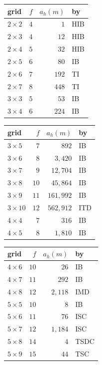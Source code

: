 \begin{table}[!htb]
\centering\scriptsize\setlength{\tabcolsep}{3pt}
\begin{tabular}{@{}lrrl@{}}
\toprule
grid & $f$ & $a_h(m)$ & by \\
\midrule
$2\times2$ & $4$ & $1$ & HIB \\
$2\times3$ & $4$ & $12$ & HIB \\
$2\times4$ & $5$ & $32$ & HIB \\
$2\times5$ & $6$ & $80$ & IB \\
$2\times6$ & $7$ & $192$ & TI \\
$2\times7$ & $8$ & $448$ & TI \\
$3\times3$ & $5$ & $53$ & IB \\
$3\times4$ & $6$ & $224$ & IB \\
\bottomrule
\end{tabular}\hspace{1em}
\begin{tabular}{@{}lrrl@{}}
\toprule
grid & $f$ & $a_h(m)$ & by \\
\midrule
$3\times5$ & $7$ & $892$ & IB \\
$3\times6$ & $8$ & $3{,}420$ & IB \\
$3\times7$ & $9$ & $12{,}704$ & IB \\
$3\times8$ & $10$ & $45{,}864$ & IB \\
$3\times9$ & $11$ & $161{,}992$ & IB \\
$3\times10$ & $12$ & $562{,}912$ & ITD \\
$4\times4$ & $7$ & $316$ & IB \\
$4\times5$ & $8$ & $1{,}810$ & IB \\
\bottomrule
\end{tabular}\hspace{1em}
\begin{tabular}{@{}lrrl@{}}
\toprule
grid & $f$ & $a_h(m)$ & by \\
\midrule
$4\times6$ & $10$ & $26$ & IB \\
$4\times7$ & $11$ & $292$ & IB \\
$4\times8$ & $12$ & $2{,}118$ & IMD \\
$5\times5$ & $10$ & $8$ & IB \\
$5\times6$ & $11$ & $76$ & ISC \\
$5\times7$ & $12$ & $1{,}184$ & ISC \\
$5\times8$ & $14$ & $4$ & TSDC \\
$5\times9$ & $15$ & $44$ & TSC \\

\end{tabular}
\end{table}
